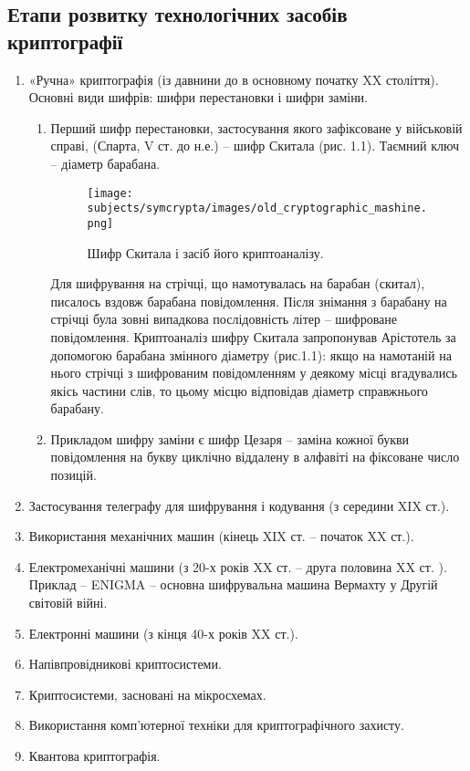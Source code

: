 \subsection{Етапи розвитку технологічних засобів криптографії}

\begin{enumerate}
    \item «Ручна» криптографія (із давнини до в основному початку XX
        століття). Основні види шифрів: шифри перестановки і шифри
        заміни.
        \begin{enumerate}
            \item Перший шифр перестановки, застосування якого зафіксоване у
            військовій справі, (Спарта, V ст. до н.е.) – шифр Скитала (рис. 1.1).
            Таємний ключ – діаметр барабана. 
    
            \begin{figure}[h]
                \centering
                \texttt{[image: subjects/symcrypta/images/old\_cryptographic\_mashine.png]}
                \caption{Шифр Скитала і засіб його криптоаналізу.}
            \end{figure}
            
            Для шифрування на стрічці, що намотувалась на барабан (скитал),
            писалось вздовж барабана повідомлення. Після знімання з барабану на
            стрічці була зовні випадкова послідовність літер – шифроване повідомлення.
            Криптоаналіз шифру Скитала запропонував Арістотель за допомогою
            барабана змінного діаметру (рис.1.1): якщо на намотаній на нього стрічці з
            шифрованим повідомленням у деякому місці вгадувались якісь частини слів,
            то цьому місцю відповідав діаметр справжнього барабану.
            
            \item Прикладом шифру заміни є шифр Цезаря – заміна кожної букви
            повідомлення на букву циклічно віддалену в алфавіті на фіксоване число
            позицій.
        \end{enumerate}
    \item Застосування телеграфу для шифрування і кодування
        (з середини XIX ст.).
    \item Використання механічних машин (кінець XIX ст. – початок XX ст.).
    \item Електромеханічні машини (з 20-х років XX ст. – друга половина XX
        ст. ). Приклад – ENIGMA – основна шифрувальна машина Вермахту у Другій
        світовій війні.
    \item Електронні машини (з кінця 40-х років XX ст.).
    \item Напівпровідникові криптосистеми.
    \item Криптосистеми, засновані на мікросхемах.
    \item Використання комп'ютерної техніки для криптографічного захисту.
    \item Квантова криптографія.
\end{enumerate}

